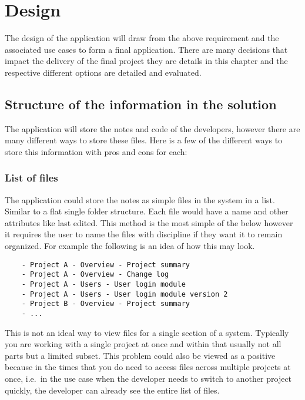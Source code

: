 \chapter{Design}\label{design}

The design of the application will draw from the above requirement and
the associated use cases to form a final application. There are many
decisions that impact the delivery of the final project they are details
in this chapter and the respective different options are detailed and
evaluated.

\section{Structure of the information in the
solution}\label{structure-of-the-information-in-the-solution}

The application will store the notes and code of the developers, however
there are many different ways to store these files. Here is a few of the
different ways to store this information with pros and cons for each:

\subsection{List of files}\label{list-of-files}

The application could store the notes as simple files in the system in a
list. Similar to a flat single folder structure. Each file would have a
name and other attributes like last edited. This method is the most
simple of the below however it requires the user to name the files with
discipline if they want it to remain organized. For example the
following is an idea of how this may look.

\begin{verbatim}
    - Project A - Overview - Project summary
    - Project A - Overview - Change log
    - Project A - Users - User login module
    - Project A - Users - User login module version 2
    - Project B - Overview - Project summary
    - ...
\end{verbatim}

This is not an ideal way to view files for a single section of a system.
Typically you are working with a single project at once and within that
usually not all parts but a limited subset. This problem could also be
viewed as a positive because in the times that you do need to access
files across multiple projects at once, i.e.~in the use case when the
developer needs to switch to another project quickly, the developer can
already see the entire list of files.

